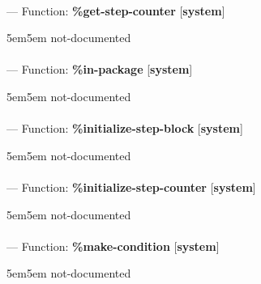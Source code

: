 \paragraph{}
\label{SYSTEM:GET-STEP-COUNTER}
--- Function: \textbf{\%get-step-counter} [\textbf{system}] \textit{}

\begin{adjustwidth}{5em}{5em}
not-documented
\end{adjustwidth}

\paragraph{}
\label{SYSTEM:IN-PACKAGE}
--- Function: \textbf{\%in-package} [\textbf{system}] \textit{}

\begin{adjustwidth}{5em}{5em}
not-documented
\end{adjustwidth}

\paragraph{}
\label{SYSTEM:INITIALIZE-STEP-BLOCK}
--- Function: \textbf{\%initialize-step-block} [\textbf{system}] \textit{}

\begin{adjustwidth}{5em}{5em}
not-documented
\end{adjustwidth}

\paragraph{}
\label{SYSTEM:INITIALIZE-STEP-COUNTER}
--- Function: \textbf{\%initialize-step-counter} [\textbf{system}] \textit{}

\begin{adjustwidth}{5em}{5em}
not-documented
\end{adjustwidth}

\paragraph{}
\label{SYSTEM:MAKE-CONDITION}
--- Function: \textbf{\%make-condition} [\textbf{system}] \textit{}

\begin{adjustwidth}{5em}{5em}
not-documented
\end{adjustwidth}

